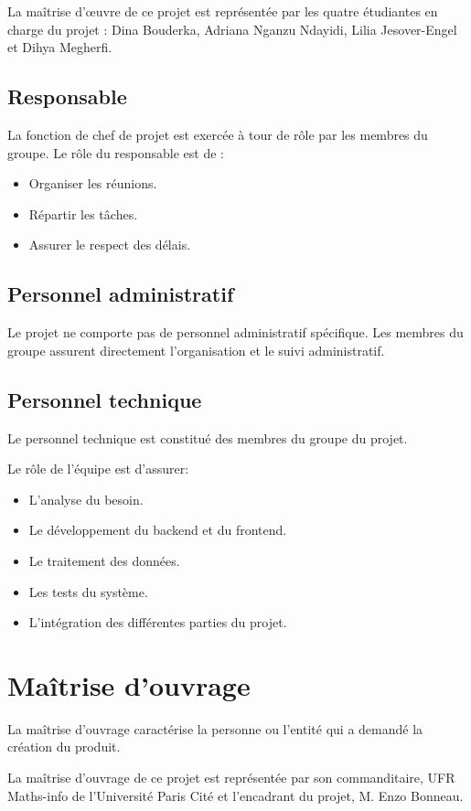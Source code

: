 \documentclass[a4paper,12pt]{report}
\begin{document}
La maîtrise d'œuvre de ce projet est représentée par les quatre étudiantes en charge du projet : Dina Bouderka, Adriana Nganzu Ndayidi, Lilia Jesover-Engel et Dihya Megherfi.  
  
\subsection{Responsable}
La fonction de chef de projet est exercée à tour de rôle par les membres du groupe.
Le rôle du responsable est de :
\begin{itemize}
    \item Organiser les réunions.
    \item Répartir les tâches.
    \item Assurer le respect des délais.
\end{itemize}
\subsection{Personnel administratif}
Le projet ne comporte pas de personnel administratif spécifique. Les membres du groupe assurent directement l’organisation et le suivi administratif.  
\subsection{Personnel technique}
Le personnel technique est constitué des membres du groupe du projet.

Le rôle de l’équipe est d’assurer:

\begin{itemize}
\label{BE1}
    \item L’analyse du besoin.
    \item Le développement du backend et du frontend.
    \item Le traitement des données.
    \item Les tests du système.
    \item L’intégration des différentes parties du projet.
\end{itemize}
\newpage
\section{Maîtrise d’ouvrage}
La maîtrise d'ouvrage caractérise la personne ou l'entité qui a demandé la création du produit.

La maîtrise d'ouvrage de ce projet est représentée par son
commanditaire, UFR Maths-info de l'Université Paris Cité et l'encadrant du projet, M. Enzo Bonneau.
\end{document}

